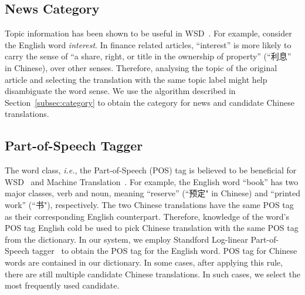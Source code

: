 \begin{CJK}{UTF8}{gbsn}

\subsection{News Category}
Topic information has been shown to be useful in
WSD~\cite{Boyd-Graber2007}.  For example, consider the English word
\textit{interest}. In finance related articles, ``interest'' is more
likely to carry the sense of ``a share, right, or title in the
ownership of property'' (``利息'' in Chinese), over other senses.
Therefore, analysing the topic of the original article and selecting
the translation with the same topic label might help disambiguate the
word sense. We use the algorithm described in
Section~\ref{subsec:category} to obtain the category for news and
candidate Chinese translations.

\subsection{Part-of-Speech Tagger}
The word class, {\it i.e.}, the Part-of-Speech (POS) tag is believed to be beneficial for WSD~\cite{Wilks1998} and Machine Translation~\cite{Toutanova2002,Ueffing2003}.
For example, the English word ``book'' has two major classes, verb and noun, meaning ``reserve'' (``预定" in Chinese) and ``printed work'' (``书"), respectively. The two Chinese translations have the same POS tag as their corresponding English counterpart.
Therefore, knowledge of the word's POS tag English cold be used to pick Chinese translation with the same POS tag from the dictionary.
In our system, we employ Standford Log-linear Part-of-Speech tagger~\cite{Toutanova2003} to obtain the POS tag for the English word. POS tag for Chinese words are contained in our dictionary.
In some cases, after applying this rule, there are still multiple candidate Chinese translations. In such cases, we select the most frequently used candidate.


\end{CJK}
